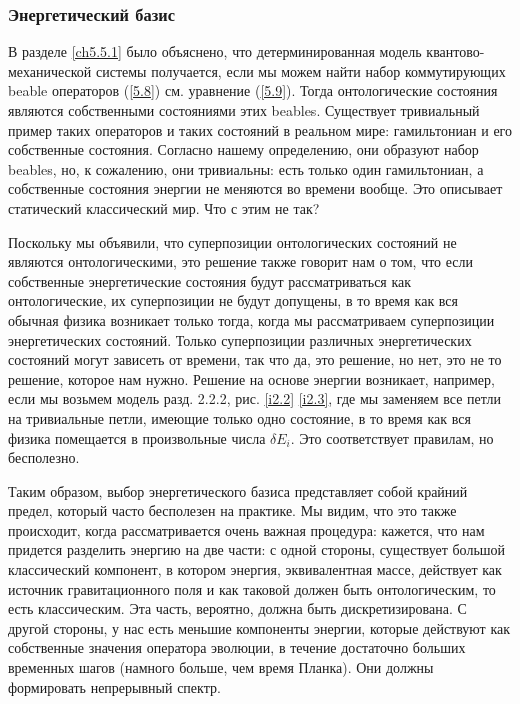 \documentclass[main.tex]{subfiles}
\begin{document}
\subsubsection{Энергетический базис}\label{ch5.6.3}

В разделе \ref{ch5.5.1} было объяснено, что детерминированная модель квантово-механической системы получается, если мы можем найти набор коммутирующих beable операторов (\ref{5.8}) см. уравнение (\ref{5.9}). Тогда онтологические состояния являются собственными состояниями этих beables. Существует тривиальный пример таких операторов и таких состояний в реальном мире: гамильтониан и его собственные состояния. Согласно нашему определению, они образуют набор beables, но, к сожалению, они тривиальны: есть только один гамильтониан, а собственные состояния энергии не меняются во времени вообще. Это описывает статический классический мир. Что с этим не так?

Поскольку мы объявили, что суперпозиции онтологических состояний не являются онтологическими, это решение также говорит нам о том, что если собственные энергетические состояния будут рассматриваться как онтологические, их суперпозиции не будут допущены, в то время как вся обычная физика возникает только тогда, когда мы рассматриваем суперпозиции энергетических состояний. Только суперпозиции различных энергетических состояний могут зависеть от времени, так что да, это решение, но нет, это не то решение, которое нам нужно. Решение на основе энергии возникает, например, если мы возьмем модель разд. 2.2.2, рис. \ref{i2.2} \ref{i2.3}, где мы заменяем все петли на тривиальные петли, имеющие только одно состояние, в то время как вся физика помещается в произвольные числа $\delta E_i$. Это соответствует правилам, но бесполезно.

Таким образом, выбор энергетического базиса представляет собой крайний предел, который часто бесполезен на практике. Мы видим, что это также происходит, когда рассматривается очень важная процедура: кажется, что нам придется разделить энергию на две части: с одной стороны, существует большой классический компонент, в котором энергия, эквивалентная массе, действует как источник гравитационного поля и как таковой должен быть онтологическим, то есть классическим. Эта часть, вероятно, должна быть дискретизирована. С другой стороны, у нас есть меньшие компоненты энергии, которые действуют как собственные значения оператора эволюции, в течение достаточно больших временных шагов (намного больше, чем время Планка). Они должны формировать непрерывный спектр.
\end{document}
